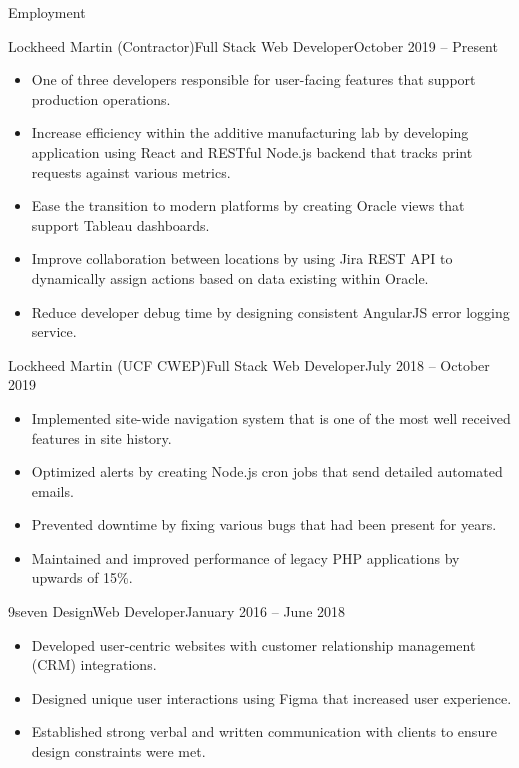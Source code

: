 \documentclass[calibri]{mcdowellcv}
\begin{document}
	\makeheader
	
	\begin{cvsection}{Employment}
		\begin{cvsubsection}{Lockheed Martin (Contractor)}{Full Stack Web Developer}{October 2019 -- Present}		
			\begin{itemize}
				\item One of three developers responsible for user-facing features that support production operations.
				\item Increase efficiency within the additive manufacturing lab by developing application using React and RESTful Node.js backend that tracks print requests against various metrics.
				\item Ease the transition to modern platforms by creating Oracle views that support Tableau dashboards.
				\item Improve collaboration between locations by using Jira REST API to dynamically assign actions based on data existing within Oracle.
				\item Reduce developer debug time by designing consistent AngularJS error logging service.
			\end{itemize}
		\end{cvsubsection}
		
		\begin{cvsubsection}{Lockheed Martin (UCF CWEP)}{Full Stack Web Developer}{July 2018 -- October 2019}	
			\begin{itemize}
				\item Implemented site-wide navigation system that is one of the most well received features in site history.
				\item Optimized alerts by creating Node.js cron jobs that send detailed automated emails.
				\item Prevented downtime by fixing various bugs that had been present for years.
				\item Maintained and improved performance of legacy PHP applications by upwards of 15\%.
			\end{itemize}
		\end{cvsubsection}
		
		\begin{cvsubsection}{9seven Design}{Web Developer}{January 2016 -- June 2018}		
			\begin{itemize}
				\item Developed user-centric websites with customer relationship management (CRM) integrations.
				\item Designed unique user interactions using Figma that increased user experience.
				\item Established strong verbal and written communication with clients to ensure design constraints were met.
			\end{itemize}
		\end{cvsubsection}
	\end{cvsection}
	
\end{document}
